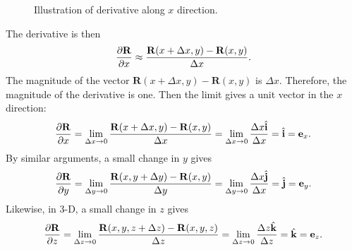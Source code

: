 \begin{figure}[htb!]
\begin{center}
\caption{Illustration of derivative along $x$ direction.}
\label{Fig:vector_illustrationOfDerivative_Cartesian}
\end{center}
\end{figure}

The derivative is then
\begin{align}
  \frac{ \partial {\mathbf{R}} }{ \partial {x} } \approx \frac{ \mathbf{R}(x + \Delta x, y) - \mathbf{R}(x,y) }{ \Delta x } .
\end{align}
The magnitude of the vector $\mathbf{R}(x + \Delta x, y) - \mathbf{R}(x,y)$ is $\Delta x$. Therefore, the magnitude of the derivative is one. Then the limit gives a unit vector in the $x$ direction:
\begin{align}
   \frac{ \partial {\mathbf{R}} }{ \partial {x} } = \lim_{\Delta x \rightarrow 0} \frac{ \mathbf{R}(x + \Delta x, y) - \mathbf{R}(x,y) }{ \Delta x } 
   =  \lim_{\Delta x \rightarrow 0} \frac{ \Delta x \hat{\mathbf{i}}}{ \Delta x } = \hat{\mathbf{i}} = \mathbf{e}_x.
\end{align}
By similar arguments, a small change in $y$ gives
\begin{align}
   \frac{ \partial {\mathbf{R}} }{ \partial {y} } = \lim_{\Delta y \rightarrow 0} \frac{ \mathbf{R}(x, y + \Delta y ) - \mathbf{R}(x,y) }{ \Delta y } 
   =  \lim_{\Delta y \rightarrow 0} \frac{ \Delta x \hat{\mathbf{j}}}{ \Delta x } = \hat{\mathbf{j}} = \mathbf{e}_y.
\end{align}
Likewise, in 3-D, a small change in $z$ gives
\begin{align}
   \frac{ \partial {\mathbf{R}} }{ \partial {z} } = \lim_{\Delta z \rightarrow 0} \frac{ \mathbf{R}(x, y, z + \Delta z ) - \mathbf{R}(x,y,z) }{ \Delta z } 
   = \lim_{\Delta z \rightarrow 0} \frac{ \Delta z \hat{\mathbf{k}}}{ \Delta z } = \hat{\mathbf{k}} = \mathbf{e}_z .
\end{align}

